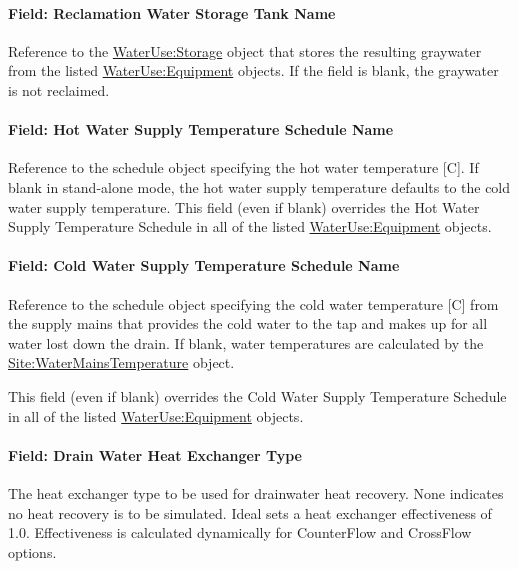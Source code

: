\paragraph{Field: Reclamation Water Storage Tank Name}\label{field-reclamation-water-storage-tank-name}

Reference to the \hyperref[waterusestorage]{WaterUse:Storage} object that stores the resulting graywater from the listed \hyperref[wateruseequipment]{WaterUse:Equipment} objects. If the field is blank, the graywater is not reclaimed.

\paragraph{Field: Hot Water Supply Temperature Schedule Name}\label{field-hot-water-supply-temperature-schedule-name-1}

Reference to the schedule object specifying the hot water temperature {[}C{]}. If blank in stand-alone mode, the hot water supply temperature defaults to the cold water supply temperature. This field (even if blank) overrides the Hot Water Supply Temperature Schedule in all of the listed \hyperref[wateruseequipment]{WaterUse:Equipment} objects.

\paragraph{Field: Cold Water Supply Temperature Schedule Name}\label{field-cold-water-supply-temperature-schedule-name-1-000}

Reference to the schedule object specifying the cold water temperature {[}C{]} from the supply mains that provides the cold water to the tap and makes up for all water lost down the drain. If blank, water temperatures are calculated by the \hyperref[sitewatermainstemperature]{Site:WaterMainsTemperature} object.

This field (even if blank) overrides the Cold Water Supply Temperature Schedule in all of the listed \hyperref[wateruseequipment]{WaterUse:Equipment} objects.

\paragraph{Field: Drain Water Heat Exchanger Type}\label{field-drain-water-heat-exchanger-type}

The heat exchanger type to be used for drainwater heat recovery. None indicates no heat recovery is to be simulated. Ideal sets a heat exchanger effectiveness of 1.0. Effectiveness is calculated dynamically for CounterFlow and CrossFlow options.

